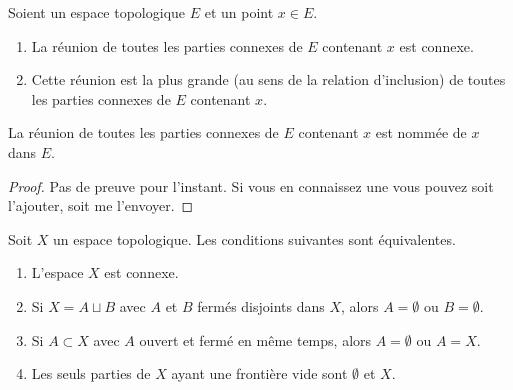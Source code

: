 \begin{propositionDef}        \label{DEFooFHXNooJGUPPn}
    Soient un espace topologique \( E\) et un point \( x\in E\).
    \begin{enumerate}
        \item
            La réunion de toutes les parties connexes de \( E\) contenant $x$ est connexe. 
        \item
            Cette réunion est la plus grande (au sens de la relation d'inclusion) de toutes les parties connexes de \( E\) contenant $x$.
    \end{enumerate}
    La réunion de toutes les parties connexes de \( E\) contenant $x$ est nommée  de \( x\) dans \( E\).
\end{propositionDef}

\begin{proof}
    Pas de preuve pour l'instant. Si vous en connaissez une vous pouvez soit l'ajouter, soit me l'envoyer.
\end{proof}

\begin{proposition} \label{PropHSjJcIr}
    Soit \( X\) un espace topologique. Les conditions suivantes sont équivalentes.
    \begin{enumerate}
    \item \label{ITEMooNIPZooIDPmEc}
      L'espace \( X\) est connexe.
    \item  \label{ITEMooNIPZooIDPmEd}
      Si \( X=A\sqcup B\) avec \( A\) et \( B\) fermés disjoints dans \( X\), alors \( A=\emptyset\) ou \( B=\emptyset\).
    \item       \label{ITEMooNIPZooIDPmEf}
      Si \( A\subset X\) avec \( A\) ouvert et fermé en même temps, alors \( A=\emptyset\) ou \( A=X\).
    \item \label{ITEMooNIPZooIDPmEe}
      Les seuls parties de \(X \) ayant une frontière vide sont \( \emptyset \) et \(X \).
    \end{enumerate}
\end{proposition}


